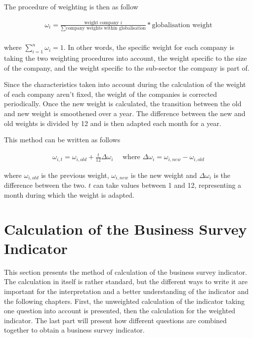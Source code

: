 \documentclass[12pt,a4paper,oneside]{book}
\begin{document}
The procedure of weighting is then as follow

\begin{eqnarray}
    \omega_i = \frac{ \text{weight company $i$} }{ \sum\text{company weights within globalisation} } * \text{globalisation weight} \\ \nonumber
\end{eqnarray}

where $\sum_{i=1}^{n} \omega_i = 1 $. In other words, the specific weight for each company is taking the two weighting procedures into account, the weight specific to the size of the company, and the weight specific to the sub-sector the company is part of.

Since the characteristics taken into account during the calculation of the weight of each company aren't fixed, the weight of the companies is corrected periodically. 
Once the new weight is calculated, the transition between the old and new weight is smoothened over a year. The difference between the new and old weights is divided by 12 and is then adapted each month for a year.

This method can be written as follows

\begin{eqnarray}
    \omega_{i, t} = \omega_{i, old} + \frac{t}{12} \Delta \omega_i \quad \text{ where } \Delta \omega_i = \omega_{i, new} - \omega_{i, old} 
\end{eqnarray}

where $\omega_{i, old}$ is the previous weight, $\omega_{i, new}$ is the new weight and $\Delta \omega_i$ is the difference between the two. $t$ can take values between 1 and 12, representing a month during which the weight is adapted.

\section{Calculation of the Business Survey Indicator}

This section presents the method of calculation of the business survey indicator.
The calculation in itself is rather standard, but the different ways to write it are important for the interpretation and a better understanding of the indicator and the following chapters.
First, the unweighted calculation of the indicator taking one question into account is presented, then the calculation for the weighted indicator. 
The last part will present how different questions are combined together to obtain a business survey indicator.
\end{document}
